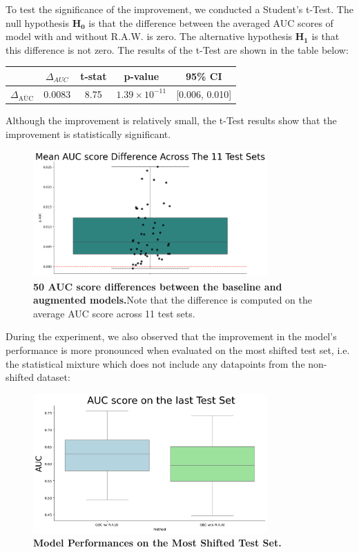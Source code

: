To test the significance of the improvement, we conducted a Student's t-Test. The null hypothesis $\boldsymbol{H_0}$ is that the difference between the averaged AUC scores of model with and without R.A.W. is zero. The alternative hypothesis $\boldsymbol{H_1}$ is that this difference is not zero. The results of the t-Test are shown in the table below:

\begin{table}[H]
    \centering
    \begin{tabular}{lcccc}
        \toprule
        & $\Delta_{AUC}$ & t-stat & p-value & 95\% CI \\
        \midrule
        $\Delta_{\overline{\text{AUC}}}$ & 0.0083 & 8.75  & $1.39 \times 10^{-11}$ & [0.006, 0.010] \\
        \bottomrule
    \end{tabular}
\end{table}

Although the improvement is relatively small, the t-Test results show that the improvement is statistically significant.

\begin{figure}[H]
    \centering
    \includegraphics[width=0.8\textwidth]{assets/diffAUC10.png} 
    \caption{\textbf{50 AUC score differences between the baseline and augmented models.}Note that the difference is computed on the average AUC score across 11 test sets.}
\end{figure}


During the experiment, we also observed that the improvement in the model's performance is more pronounced when evaluated on the most shifted test set, i.e. the statistical mixture which does not include any datapoints from the non-shifted dataset:

\begin{figure}[H]
    \centering
    \includegraphics[width=0.8\textwidth]{assets/MeanAUCscoreLAST.png} 
    \caption{\textbf{Model Performances on the Most Shifted Test Set.}}
\end{figure}

